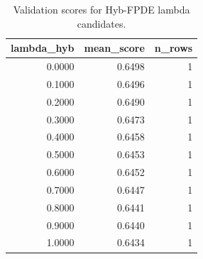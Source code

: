 \begin{table}[t]
\caption{Validation scores for Hyb-FPDE lambda candidates.}
\label{tab:lambda_distribution_computed}
\centering
\begin{tabular}{rrr}
\toprule
lambda\_hyb & mean\_score & n\_rows \\
\midrule
0.0000 & 0.6498 & 1 \\
0.1000 & 0.6496 & 1 \\
0.2000 & 0.6490 & 1 \\
0.3000 & 0.6473 & 1 \\
0.4000 & 0.6458 & 1 \\
0.5000 & 0.6453 & 1 \\
0.6000 & 0.6452 & 1 \\
0.7000 & 0.6447 & 1 \\
0.8000 & 0.6441 & 1 \\
0.9000 & 0.6440 & 1 \\
1.0000 & 0.6434 & 1 \\
\bottomrule
\end{tabular}

\end{table}
